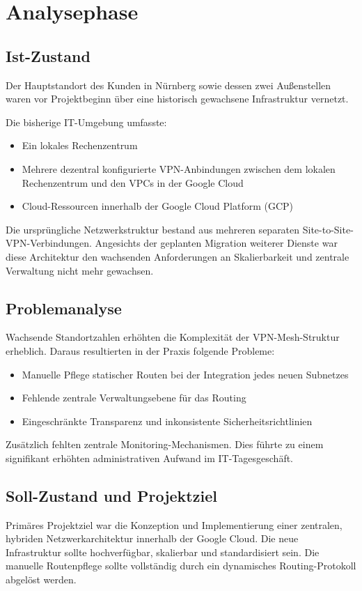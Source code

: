 \chapter{Analysephase}

\section{Ist-Zustand}
Der Hauptstandort des Kunden in Nürnberg sowie dessen zwei Außenstellen waren vor Projektbeginn über eine historisch gewachsene Infrastruktur vernetzt. 

Die bisherige IT-Umgebung umfasste:
\begin{itemize}
    \item Ein lokales Rechenzentrum
    \item Mehrere dezentral konfigurierte VPN-Anbindungen zwischen dem lokalen Rechenzentrum und den VPCs in der Google Cloud
    \item Cloud-Ressourcen innerhalb der Google Cloud Platform (GCP)
\end{itemize}

Die ursprüngliche Netzwerkstruktur bestand aus mehreren separaten Site-to-Site-VPN-Verbindungen. Angesichts der geplanten Migration weiterer Dienste war diese Architektur den wachsenden Anforderungen an Skalierbarkeit und zentrale Verwaltung nicht mehr gewachsen.

\section{Problemanalyse}
Wachsende Standortzahlen erhöhten die Komplexität der VPN-Mesh-Struktur erheblich. Daraus resultierten in der Praxis folgende Probleme:
\begin{itemize}
    \item Manuelle Pflege statischer Routen bei der Integration jedes neuen Subnetzes
    \item Fehlende zentrale Verwaltungsebene für das Routing
    \item Eingeschränkte Transparenz und inkonsistente Sicherheitsrichtlinien
\end{itemize}

Zusätzlich fehlten zentrale Monitoring-Mechanismen. Dies führte zu einem signifikant erhöhten administrativen Aufwand im IT-Tagesgeschäft.

\section{Soll-Zustand und Projektziel}
Primäres Projektziel war die Konzeption und Implementierung einer zentralen, hybriden Netzwerkarchitektur innerhalb der Google Cloud. Die neue Infrastruktur sollte hochverfügbar, skalierbar und standardisiert sein. Die manuelle Routenpflege sollte vollständig durch ein dynamisches Routing-Protokoll abgelöst werden.

